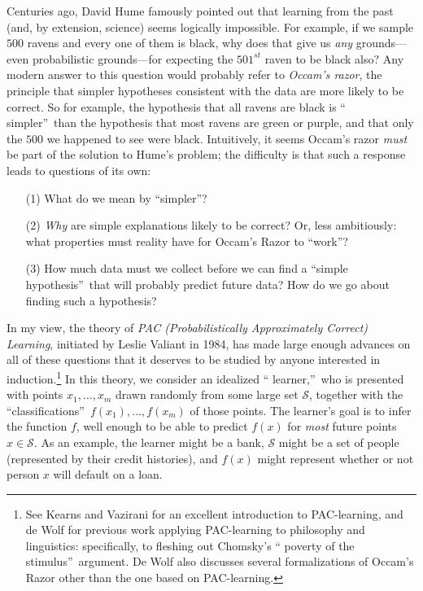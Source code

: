 \documentclass[12pt,onecolumn]{article}%
\begin{document}
Centuries ago, David Hume \cite{hume} famously pointed out that learning from
the past (and, by extension, science) seems logically impossible. For
example, if we sample $500$ ravens and every one of them is black, why does
that give us \textit{any} grounds---even probabilistic grounds---for expecting
the $501^{st}$ raven to be black also? Any modern answer to this question
would probably refer to \textit{Occam's razor}, the principle that simpler
hypotheses consistent with the data are more likely to be correct. So for
example, the hypothesis that all ravens are black is \textquotedblleft
simpler\textquotedblright\  than the hypothesis that most ravens are green or
purple, and that only the $500$ we happened to see were black. Intuitively,
it seems Occam's razor \textit{must} be part of the solution to Hume's
problem; the difficulty is that such a response leads to questions of its own:

\begin{enumerate}
\item[(1)] What do we mean by \textquotedblleft simpler\textquotedblright ?

\item[(2)] \textit{Why} are simple explanations likely to be correct? Or,
less ambitiously: what properties must reality have for Occam's Razor to
\textquotedblleft work\textquotedblright ?

\item[(3)] How much data must we collect before we can find a
\textquotedblleft simple hypothesis\textquotedblright\  that will probably
predict future data? How do we go about finding such a hypothesis?
\end{enumerate}

In my view, the theory of \textit{PAC (Probabilistically Approximately
Correct) Learning}, initiated by Leslie Valiant \cite{valiant:pac} in 1984,
has made large enough advances on all of these questions that it deserves to
be studied by anyone interested in induction.\footnote{See Kearns and Vazirani
\cite{kvaz} for an excellent introduction to PAC-learning, and de Wolf
\cite{dewolf:masters} for previous work applying PAC-learning to philosophy
and linguistics: specifically, to fleshing out Chomsky's \textquotedblleft
poverty of the stimulus\textquotedblright\  argument. De Wolf also discusses
several formalizations of Occam's Razor other than the one based on
PAC-learning.} In this theory, we consider an idealized \textquotedblleft
learner,\textquotedblright\  who is presented with points $x_{1},\ldots,x_{m}%
$ drawn randomly from some large set $\mathcal{S}$, together with the
\textquotedblleft classifications\textquotedblright\  $f\left(  x_{1}\right)
,\ldots,f\left(  x_{m}\right)  $ of those points. The learner's goal is to
infer the function $f$, well enough to be able to predict $f\left(  x\right)
$ for \textit{most} future points $x\in\mathcal{S}$. As an example, the
learner might be a bank, $\mathcal{S}$ might be a set of people (represented
by their credit histories), and $f\left(  x\right)  $ might represent whether
or not person $x$ will default on a loan.
\end{document}
